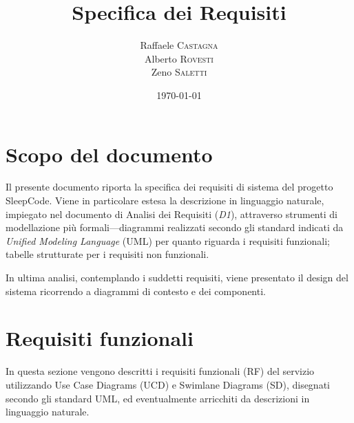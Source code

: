 \documentclass[11pt, a4paper]{article}
\title{Specifica dei Requisiti}
\author{Raffaele \textsc{Castagna}\\
Alberto \textsc{Rovesti}\\
Zeno \textsc{Saletti}}
\date{\today}
\theoremstyle{definition} %
\begin{document}


\tableofcontents

\newpage

\section*{Scopo del documento}
Il presente documento riporta la specifica dei requisiti di sistema
del progetto SleepCode. Viene in particolare estesa la descrizione
in linguaggio naturale, impiegato nel documento di Analisi dei Requisiti
(\textit{D1}), attraverso strumenti di modellazione più formali—diagrammi
realizzati secondo gli standard indicati da \textit{Unified Modeling Language}
(UML) per quanto riguarda i requisiti funzionali; tabelle strutturate
per i requisiti non funzionali.

In ultima analisi, contemplando i suddetti requisiti, viene presentato il
design del sistema ricorrendo a diagrammi di contesto e dei componenti.


\newpage
\section{Requisiti funzionali}
In questa sezione vengono descritti i requisiti funzionali (RF) del
servizio utilizzando Use Case Diagrams (UCD) e Swimlane Diagrams (SD), disegnati secondo
gli standard UML, ed eventualmente arricchiti da descrizioni in linguaggio
naturale.
\end{document}
